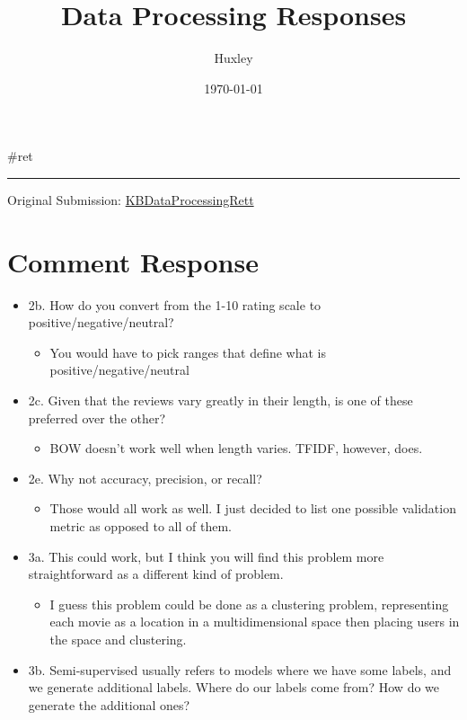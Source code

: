 \documentclass[letterpaper]{article}
\author{Huxley}
\date{\today}
\title{Data Processing Responses}
\renewcommand\maketitle{}
\begin{document}
\maketitle
\#ret

\noindent\rule{\textwidth}{0.5pt}

Original Submission:
\href{KBDataProcessingRett.org}{KBDataProcessingRett}

\section{Comment Response}
\label{sec:org335d2ca}
\begin{itemize}
\item 2b. How do you convert from the 1-10 rating scale to
positive/negative/neutral?

\begin{itemize}
\item You would have to pick ranges that define what is
positive/negative/neutral
\end{itemize}

\item 2c. Given that the reviews vary greatly in their length, is one of
these preferred over the other?

\begin{itemize}
\item BOW doesn't work well when length varies. TFIDF, however, does.
\end{itemize}

\item 2e. Why not accuracy, precision, or recall?

\begin{itemize}
\item Those would all work as well. I just decided to list one possible
validation metric as opposed to all of them.
\end{itemize}

\item 3a. This could work, but I think you will find this problem more
straightforward as a different kind of problem.

\begin{itemize}
\item I guess this problem could be done as a clustering problem,
representing each movie as a location in a multidimensional space
then placing users in the space and clustering.
\end{itemize}

\item 3b. Semi-supervised usually refers to models where we have some
labels, and we generate additional labels. Where do our labels come
from? How do we generate the additional ones?


\end{itemize}
\end{document}

